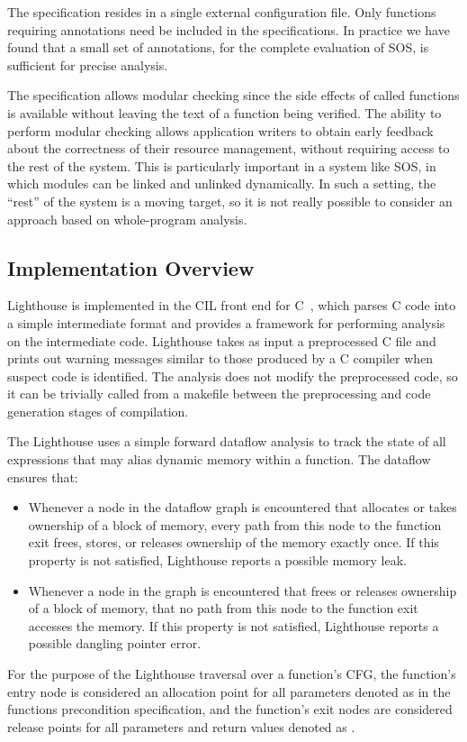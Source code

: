 The specification resides in a single external configuration file.
%
Only functions requiring annotations need be included in the specifications.
%
In practice we have found that a small set of annotations, \numannote for
the complete evaluation of SOS, is sufficient for precise analysis. 



The specification allows modular checking since the side effects of
called functions is available without leaving the text of a function being
verified.
%
The ability to perform modular checking allows application writers to
obtain early feedback about the correctness of their resource management,
without requiring access to the rest of the system.  
%
This is particularly important in a system like SOS, in which modules can be
linked and unlinked dynamically.  
%
In such a setting, the ``rest'' of the system is a moving target, so it is
not really possible to consider an approach based on whole-program analysis.



\subsection{Implementation Overview}



Lighthouse is implemented in the CIL front end for C~\cite{CIL}, which
parses C code into a simple intermediate format and provides a framework for
performing analysis on the intermediate code. 
%
Lighthouse takes as input a preprocessed C file and prints out warning
messages similar to those produced by a C compiler when suspect code is
identified.
%
The analysis does not modify the preprocessed code, so it can be trivially
called from a makefile between the preprocessing and code generation stages
of compilation.



The Lighthouse uses a simple forward dataflow analysis to track the state of
all expressions that may alias dynamic memory within a function.
%
The dataflow ensures that:
%
\begin{itemize}
%
\item Whenever a node in the dataflow graph is encountered that allocates or
takes ownership of a block of memory, every path from this node to the
function exit frees, stores, or releases ownership of the memory exactly
once.  
%
If this property is not satisfied, Lighthouse reports a possible memory
leak.
%
\item Whenever a node in the graph is encountered that frees or releases
ownership of a block of memory, that no path from this node to the function
exit accesses the memory.  
%
If this property is not satisfied, Lighthouse reports a possible dangling
pointer error.
%
\end{itemize}
%
For the purpose of the Lighthouse traversal over a function's CFG, the
function's entry node is considered an allocation point for all parameters
denoted as  in the functions precondition specification, and the
function's exit nodes are considered release points for all parameters and
return values denoted as .



